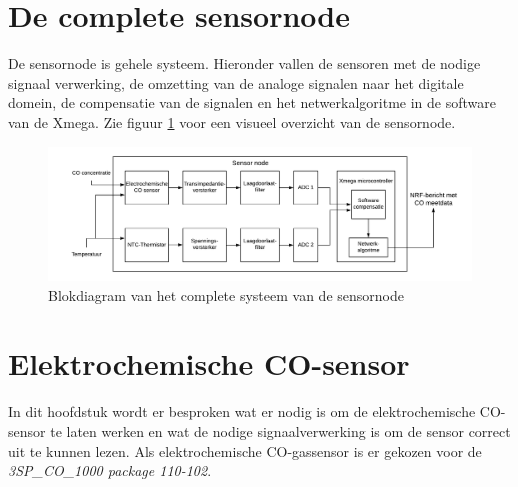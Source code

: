 \documentclass[a4paper, 11pt]{article} %
\begin{document}
	\section{De complete sensornode} \label{sec::sensornode}
	De sensornode is gehele systeem. Hieronder vallen de sensoren met de nodige signaal verwerking, de omzetting van de analoge signalen naar het digitale domein, de compensatie van de signalen en het netwerkalgoritme in de software van de Xmega. Zie figuur \ref{fig::sensorNode_dia} voor een visueel overzicht van de sensornode.
	\begin{figure}[h!]
		\centering
		\hspace*{-4cm} 
		\includegraphics[width=1.7\linewidth]{../Media/sensorNode_dia.png}
		\caption{Blokdiagram van het complete systeem van de sensornode}
		\label{fig::sensorNode_dia}
	\end{figure}
	\newpage
	\section{Elektrochemische CO-sensor } \label{sec::EG_CO_sensor}
	In dit hoofdstuk wordt er besproken wat er nodig is om de elektrochemische CO-sensor te laten werken en wat de nodige signaalverwerking is om de sensor correct uit te kunnen lezen. Als elektrochemische CO-gassensor is er gekozen voor de \textit{3SP\_CO\_1000 package 110-102}.
\end{document}
